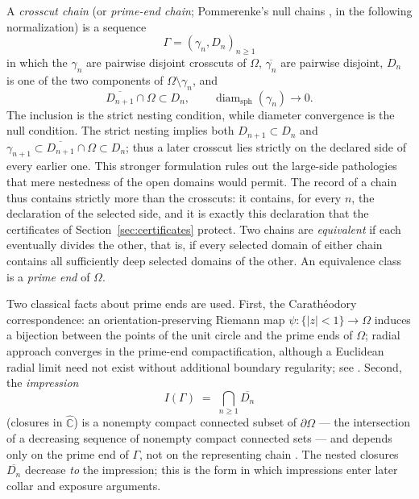 \documentclass[11pt,reqno]{amsart}
\theoremstyle{definition}
\theoremstyle{remark}
\newcommand{\Chat}{\widehat{\mathbb C}}
\begin{document}
A \emph{crosscut chain} (or \emph{prime-end chain}; Pommerenke's null
chains \cite{Pom92}, in the following normalization) is a sequence
\[
\Gamma=(\gamma_n,D_n)_{n\ge1}
\]
in which the $\gamma_n$ are pairwise disjoint crosscuts of $\Omega$,
$\overline{\gamma_n}$ are pairwise disjoint,
$D_n$ is one of the two components of
$\Omega\setminus\gamma_n$, and
\begin{equation}\label{eq:A-null-chain}
 \overline{D_{n+1}}\cap\Omega\subset D_n,
 \qquad
 \operatorname{diam}_{\mathrm{sph}}(\gamma_n)\longrightarrow0 .
\end{equation}
The inclusion is the strict nesting condition, while diameter convergence
is the null condition.  The strict nesting implies both
$D_{n+1}\subset D_n$ and
$\gamma_{n+1}\subset\overline{D_{n+1}}\cap\Omega\subset D_n$; thus a
later crosscut lies strictly on the declared side of every earlier one.
This stronger formulation rules out the large-side pathologies that mere
nestedness of the open domains would permit.
The record of a chain thus contains strictly more than the crosscuts: it
contains, for every $n$, the declaration of the selected side, and it is
exactly this declaration that the certificates of
Section~\ref{sec:certificates} protect.  Two chains are
\emph{equivalent} if each eventually divides the other, that is, if every
selected domain of either chain contains all sufficiently deep selected
domains of the other.  An equivalence class is a \emph{prime end} of
$\Omega$.

Two classical facts about prime ends are used.  First, the
Carath\'eodory correspondence: an orientation-preserving Riemann map
$\psi\colon\{|z|<1\}\to\Omega$ induces a bijection between the points of
the unit circle and the prime ends of $\Omega$; radial approach converges
in the prime-end compactification, although a Euclidean radial limit need
not exist without additional boundary regularity; see
\cite[Chapter~2]{Pom92}.  Second, the
\emph{impression}
\[
I(\Gamma)\;=\;\bigcap_{n\ge1}\overline{D_n}
\]
(closures in $\Chat$) is a nonempty compact connected subset of
$\partial\Omega$ --- the intersection of a decreasing sequence of
nonempty compact connected sets --- and depends only on the prime end of
$\Gamma$, not
on the representing chain \cite{Pom92}.  The nested closures
$\overline{D_n}$ decrease \emph{to} the impression; this is the form in
which impressions enter later collar and exposure arguments.
\end{document}
